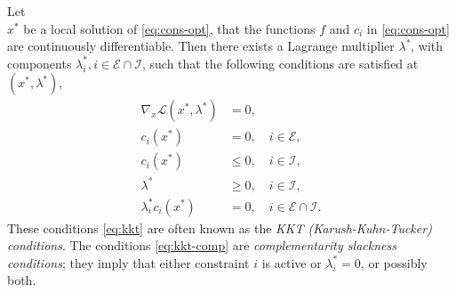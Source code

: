 \begin{definition}
    Let \\ $x^*$ be a local solution of \eqref{eq:cons-opt}, that the functions $f$ and $c_i$ in \eqref{eq:cons-opt} are continuously differentiable. Then there exists a Lagrange multiplier $\lambda^*$, with components $\lambda_i^*, i \in \mathcal{E} \cap \mathcal{I}$, such that the following conditions are satisfied at $(x^*, \lambda^*)$,
    \begin{subequations} \label{eq:kkt}
        \begin{alignat}{4}
            \nabla_x \mathcal{L}(x^*,\lambda^*) &= 0,  \\
            c_i(x^*) &= 0, \quad i \in \mathcal{E}, \\
            c_i(x^*) &\leq 0, \quad i \in \mathcal{I}, \\
            \lambda^* & \geq 0, \quad i \in \mathcal{I}, \\
            \lambda_i^* c_i(x^*) &= 0, \quad i \in \mathcal{E} \cap \mathcal{I}. \label{eq:kkt-comp}
        \end{alignat}
    \end{subequations}
These conditions \eqref{eq:kkt} are often known as the \textit{KKT (Karush-Kuhn-Tucker) conditions}. The conditions \eqref{eq:kkt-comp} are \textit{complementarity slackness conditions}; they imply that either constraint $i$ is active or $\lambda^*_i = 0$, or possibly both.
\end{definition}

